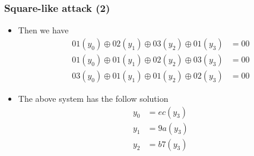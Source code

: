 \documentclass{beamer}
\begin{document}
\frame
{
\frametitle{Square-like attack (2)}
\begin{itemize}
\item Then we have
\begin{align}
01(y_{0}) \oplus 02(y_{1}) \oplus 03(y_{2}) \oplus 01(y_{3}) &= 00 \\
01(y_{0}) \oplus 01(y_{1}) \oplus 02(y_{2}) \oplus 03(y_{3}) &= 00 \\
03(y_{0}) \oplus 01(y_{1}) \oplus 01(y_{2}) \oplus 02(y_{3}) &= 00
\end{align}

\item The above system has the follow solution
\begin{align}
y_{0} &= ec(y_{3}) \\
y_{1} &= 9a(y_{3}) \\
y_{2} &= b7(y_{3})
\end{align}
\end{itemize}
}
\end{document}
